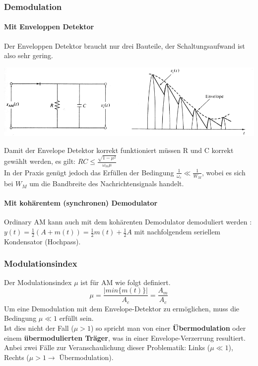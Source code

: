 \subsubsection{Demodulation}
\paragraph{Mit Enveloppen Detektor}
Der Enveloppen Detektor braucht nur drei Bauteile, der Schaltungsaufwand ist also
sehr gering.\\
\begin{center}	
      \includegraphics[width=14cm]{bilder/am_oam_enveloppeDetektor.png}
\end{center}
Damit der Envelope Detektor korrekt funktioniert müssen R und C korrekt gewählt werden, es gilt:
$RC \leq \frac{\sqrt{1 - \mu^2}}{\omega_m \mu}$ \\
In der Praxis genügt jedoch das Erfüllen der Bedingung $\frac{1}{\omega_c} \ll \frac{1}{W_M}$,
wobei es sich bei $W_M$ um die Bandbreite des Nachrichtensignals handelt. 

\paragraph{Mit kohärentem (synchronen) Demodulator}
Ordinary AM kann auch mit dem kohärenten Demodulator demoduliert werden
:
$y(t) = \frac12 (A + m(t)) = \frac12 m(t) + \frac12 A$ mit nachfolgendem
seriellem Kondensator (Hochpass).


\subsubsection{Modulationsindex}
Der Modulationsindex $\mu$ ist für AM wie folgt definiert.
$$\mu = \frac{|min\{m(t)\}|}{A_c} = \frac{A_m}{A_c} $$
Um eine Demodulation mit dem Envelope-Detektor zu ermöglichen, muss die Bedingung 
\textbf{$\mu \ll 1$} erfüllt sein. \\
Ist dies nicht der Fall (\textbf{$\mu > 1$}) so spricht man von einer \textbf{Übermodulation} oder
einem  \textbf{übermodulierten Träger}, was in einer Envelope-Verzerrung resultiert. \\
Anbei zwei Fälle zur Veranschaulichung dieser Problematik: Links ($\mu \ll 1$), Rechts ($\mu > 1
\rightarrow $ Übermodulation).

